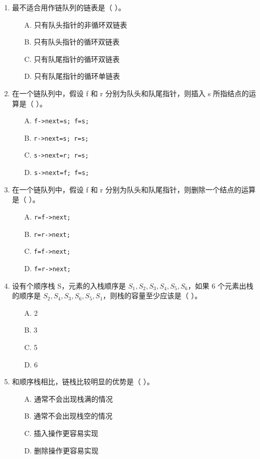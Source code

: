 \documentclass[12pt, a4paper]{article}
\begin{document}
\begin{enumerate}
    \item 最不适合用作链队列的链表是（ ）。
    \begin{enumerate}
        \item[A.] 只有队头指针的非循环双链表
        \item[B.] 只有队头指针的循环双链表
        \item[C.] 只有队尾指针的循环双链表
        \item[D.] 只有队尾指针的循环单链表
    \end{enumerate}
    
    \item 在一个链队列中，假设 f 和 r 分别为队头和队尾指针，则插入 s 所指结点的运算是（ ）。
    \begin{enumerate}
        \item[A.] \texttt{f->next=s; f=s;}
        \item[B.] \texttt{r->next=s; r=s;}
        \item[C.] \texttt{s->next=r; r=s;}
        \item[D.] \texttt{s->next=f; f=s;}
    \end{enumerate}
    
    \item 在一个链队列中，假设 f 和 r 分别为队头和队尾指针，则删除一个结点的运算是（ ）。
    \begin{enumerate}
        \item[A.] \texttt{r=f->next;}
        \item[B.] \texttt{r=r->next;}
        \item[C.] \texttt{f=f->next;}
        \item[D.] \texttt{f=r->next;}
    \end{enumerate}
    
    \item 设有个顺序栈 S，元素的入栈顺序是 $S_1, S_2, S_3, S_4, S_5, S_6$，如果 6 个元素出栈的顺序是 $S_2, S_4, S_3, S_6, S_5, S_1$，则栈的容量至少应该是（ ）。
    \begin{enumerate}
        \item[A.] 2
        \item[B.] 3
        \item[C.] 5
        \item[D.] 6
    \end{enumerate}
    
    \item 和顺序栈相比，链栈比较明显的优势是（ ）。
    \begin{enumerate}
        \item[A.] 通常不会出现栈满的情况
        \item[B.] 通常不会出现栈空的情况
        \item[C.] 插入操作更容易实现
        \item[D.] 删除操作更容易实现
    \end{enumerate}
    

\end{enumerate}
\end{document}
